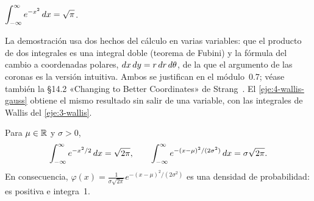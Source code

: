 \begin{teorema}\label{teo:gauss}
$\displaystyle\int_{-\infty}^{\infty}e^{-x^{2}}\mathop{}\!d x=\sqrt\pi$.
\end{teorema}

\begin{observacion}
La demostración usa dos hechos del cálculo en varias variables: que el producto de dos integrales es una integral doble (teorema de Fubini) y la fórmula del cambio a coordenadas polares, $\mathop{}\!d x\mathop{}\!d y=r\mathop{}\!d r\mathop{}\!d\theta$, de la que el argumento de las coronas es la versión intuitiva. Ambos se justifican en el módulo~0.7; véase también la §14.2 «Changing to Better Coordinates» de Strang~\cite{strang}. El \cref{eje:4-wallis-gauss} obtiene el mismo resultado sin salir de una variable, con las integrales de Wallis del \cref{eje:3-wallis}.
\end{observacion}

\begin{corolario}\label{cor:gauss}
Para $\mu\in\mathbb{R}$ y $\sigma>0$,
\[
\int_{-\infty}^{\infty}e^{-x^{2}/2}\mathop{}\!d x=\sqrt{2\pi},\qquad\int_{-\infty}^{\infty}e^{-(x-\mu)^{2}/(2\sigma^{2})}\mathop{}\!d x=\sigma\sqrt{2\pi}.
\]
En consecuencia, $\varphi(x)=\frac{1}{\sigma\sqrt{2\pi}}e^{-(x-\mu)^{2}/(2\sigma^{2})}$ es una densidad de probabilidad: es positiva e integra~1.
\end{corolario}

\addtocounter{definicion}{1}%

\addtocounter{definicion}{1}%

